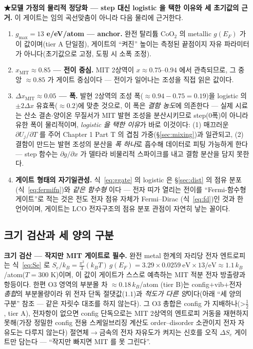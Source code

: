 \textbf{★모델 가정의 물리적 정당화 --- step 대신 logistic 을 택한 이유와 세 초기값의 근거.} 이 게이트는 임의 곡선맞춤이 아니라
다음 물리에 근거한다.
\begin{enumerate}[label=(\roman*),leftmargin=2.2em,itemsep=2pt]
\item \textbf{$g_{\max}=13$ e/eV/atom --- anchor.} 완전 탈리튬 $\mathrm{CoO_2}$ 의 metallic $g(E_F)$ 가 이 값이며(tier A 단일점)\cite{motohashi2009}, 게이트의
``켜진'' 높이는 측정된 끝점이지 자유 파라미터가 아니다(초기값으로 고정, 도핑 시 소폭 조정).
\item \textbf{$x_\mathrm{MIT}\approx0.85$ --- 전이 중심.} MIT 2상역이 $x\approx0.75$--$0.94$ 에서 관측되므로\cite{menetrier1999,reimers1992},
그 중앙 $\approx0.85$ 가 게이트 중심이다 --- 전이가 일어나는 조성을 직접 읽은 값이다.
\item \textbf{$\Delta x_\mathrm{MIT}\approx0.05$ --- 폭.} 발현 2상역의 조성 폭($\approx0.94{-}0.75=0.19$)을 logistic 의 $\pm2\Delta x$ 유효폭($\approx0.2$)에 맞춘
것으로, 이 폭은 \emph{결함 농도}에 의존한다 --- 실제 시료는 산소 결손$\cdot$양이온 무질서가 MIT 발현 조성을
분산시키므로 step(0폭)이 아니라 유한 폭이 물리적이며, \emph{logistic 을 택한 이유}가 바로 이것이다: (1) 매끄러운
$\partial U_j/\partial T$ 를 주어 Chapter 1 Part T 의 겹침 가중(\S\ref{sec:mixing})과 일관되고, (2) 결함이 만드는 발현 조성의 분산을 \emph{폭
하나}로 흡수해 데이터로 피팅 가능하게 한다 --- step 함수는 $\partial g/\partial x$ 가 델타라 비물리적 스파이크를
내고 결함 분산을 담지 못한다.
\item \textbf{게이트 형태의 자기일관성.} 식~\eqref{eq:ggate} 의 logistic 은 \S\ref{sec:dist} 의 점유 분포(식~\eqref{eq:fermifn})와 \emph{같은 함수형}
이다 --- 전자 띠가 열리는 전이를 ``Fermi-함수형 게이트''로 적는 것은 전도 전자 점유 자체가 Fermi--Dirac
(식~\eqref{eq:fd})인 것과 한 언어이며, 게이트는 LCO 전자구조의 점유 분포 관점이 자연히 낳는 꼴이다.
\end{enumerate}

\subsection{크기 검산과 세 양의 구분}\label{sec:lco-Se-scale}
\textbf{크기 검산 --- 작지만 MIT 게이트로 필수.} 완전 metal 한계의 자리당 전자 엔트로피는 식~\eqref{eq:Se} 로 $S_e/k_B=\tfrac{\pi^2}{3}(k_BT)\,g(E_F)
=3.29\times0.0259\ \mathrm{eV}\times13/\mathrm{eV}\approx1.1\,k_B$/atom($T{=}300$ K)이며, 이 값이 게이트가
스스로 예측하는 MIT 적분 전자 방출량과 항등이다. 한편 O3 영역의 부분몰 차 $\approx0.18\,k_B$/atom
\cite{reynier2004}(tier B)는 config$+$vib$+$전자 \emph{총합}의 부분몰량이라 위 전자 단독 절댓값($1.1$)과
\emph{척도가 다른 양}이다(아래 ``세 양의 구분'' 참조 --- 같은 자릿수 대조를 하지 않는다). 그 O3 총합은 config 가
지배하나(>$\tfrac12$\cite{reynier2004}, tier A), 전자항이 없으면 config 단독으로는 MIT 2상역의 엔트로피 거동을
재현하지 못해(가장 정밀한 config 전용 스케일브리징 계산\cite{ml2024}도 order--disorder 소관이지 전자
자유도는 다루지 않는다) 절연체$\to$금속의 전자 자유도가 켜지는 신호를 오직 $\Delta S_e$ 게이트만
담는다 --- ``작지만 빠지면 MIT 를 못 그린다''.

